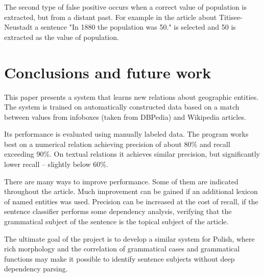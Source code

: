 \documentclass[10pt,a5paper,twoside]{article}
\begin{document}
The second type of false positive occurs when a correct value of population is extracted, but from a distant past. For example in the article about Titisee-Neustadt a sentence "In 1880 the population was 50." is selected and 50 is extracted as the value of population.

\section*{Conclusions and future work}
This paper presents a system that learns new relations about geographic entities. The system is trained on automatically constructed data based on a match between values from infoboxes (taken from DBPedia) and Wikipedia articles.

Its performance is evaluated using manually labeled data. The program works best on a numerical relation achieving precision of about 80\% and recall exceeding 90\%. On textual relations it achieves similar precision, but significantly lower recall – slightly below 60\%.

There are many ways to improve performance. Some of them are indicated throughout the article. Much improvement can be gained if an additional lexicon of named entities was used. Precision can be increased at the cost of recall, if the sentence classifier performs some dependency analysis, verifying that the grammatical subject of the sentence is the topical subject of the article.

The ultimate goal of the project is to develop a similar system for Polish, where rich morphology and the correlation of grammatical cases and grammatical functions may make it possible to identify sentence subjects without deep dependency parsing.




\end{document}
